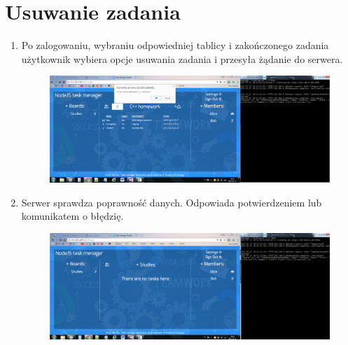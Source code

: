 \documentclass[12pt]{report}
\begin{document}
\section{Usuwanie zadania}
\begin{enumerate}
\item Po zalogowaniu, wybraniu odpowiedniej tablicy i zakończonego zadania użytkownik wybiera opcje usuwania zadania i przesyła żądanie do serwera.
\begin{figure}[!hb]
\centering
\includegraphics[width=\textwidth,height=\textheight,keepaspectratio]{C1.png}
\end{figure}
\item Serwer sprawdza poprawność danych. Odpowiada potwierdzeniem lub komunikatem o błędzię.
\begin{figure}[!hb]
\centering
\includegraphics[width=\textwidth,height=\textheight,keepaspectratio]{C2.png}
\end{figure}
\end{enumerate}
\end{document}
